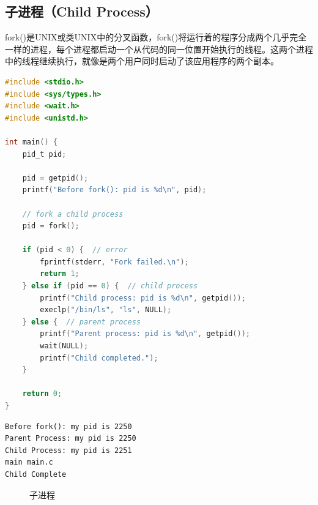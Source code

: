 \vspace{0.5cm}

\subsection{子进程（Child Process）}

fork()是UNIX或类UNIX中的分叉函数，fork()将运行着的程序分成两个几乎完全一样的进程，每个进程都启动一个从代码的同一位置开始执行的线程。这两个进程中的线程继续执行，就像是两个用户同时启动了该应用程序的两个副本。\\


\begin{lstlisting}[language=C]
#include <stdio.h>
#include <sys/types.h>
#include <wait.h>
#include <unistd.h>

int main() {
    pid_t pid;

    pid = getpid();
    printf("Before fork(): pid is %d\n", pid);

    // fork a child process
    pid = fork();

    if (pid < 0) {  // error
        fprintf(stderr, "Fork failed.\n");
        return 1;
    } else if (pid == 0) {  // child process
        printf("Child process: pid is %d\n", getpid());
        execlp("/bin/ls", "ls", NULL);
    } else {  // parent process
        printf("Parent process: pid is %d\n", getpid());
        wait(NULL);
        printf("Child completed.");
    }

    return 0;
}
\end{lstlisting}

\begin{tcolorbox}
    \begin{verbatim}
Before fork(): my pid is 2250
Parent Process: my pid is 2250
Child Process: my pid is 2251
main main.c
Child Complete
	\end{verbatim}
\end{tcolorbox}

\begin{figure}[H]
    \centering
    \caption{子进程}
\end{figure}

